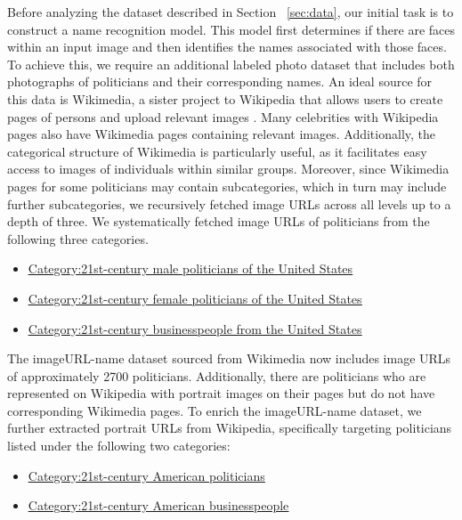 \documentclass[sigconf]{acmart}
\begin{document}
Before analyzing the dataset described in Section ~\ref{sec:data}, our initial task is to construct a name recognition model. This model first determines if there are faces within an input image and then identifies the names associated with those faces. To achieve this, we require an additional labeled photo dataset that includes both photographs of politicians and their corresponding names. An ideal source for this data is Wikimedia, a sister project to Wikipedia that allows users to create pages of persons and upload relevant images \cite{wikimedia}. Many celebrities with Wikipedia pages also have Wikimedia pages containing relevant images. Additionally, the categorical structure of Wikimedia is particularly useful, as it facilitates easy access to images of individuals within similar groups. Moreover, since Wikimedia pages for some politicians may contain subcategories, which in turn may include further subcategories, we recursively fetched image URLs across all levels up to a depth of three. We systematically fetched image URLs of politicians from the following three categories.

\begin{itemize}
  \item \href{https://commons.wikimedia.org/wiki/Category:21st-century_male_politicians_of_the_United_States}{\underline{Category:21st-century male politicians of the United States}}
  \item \href{https://commons.wikimedia.org/wiki/Category:21st-century_female_politicians_of_the_United_States}{\underline{Category:21st-century female politicians of the United States}}
  \item \href{https://commons.wikimedia.org/w/index.php?title=Category:21st-century_businesspeople_from_the_United_States&oldid=527515279}{\underline{Category:21st-century businesspeople from the United States}}
\end{itemize}

The imageURL-name dataset sourced from Wikimedia now includes image URLs of approximately 2700 politicians. Additionally, there are politicians who are represented on Wikipedia with portrait images on their pages but do not have corresponding Wikimedia pages. To enrich the imageURL-name dataset, we further extracted portrait URLs from Wikipedia, specifically targeting politicians listed under the following two categories:

\begin{itemize}
  \item \href{https://en.wikipedia.org/w/index.php?title=Category:21st-century_American_politicians&oldid=1015022478}{\underline{Category:21st-century American politicians}}
  \item \href{https://en.wikipedia.org/w/index.php?title=Category:21st-century_American_businesspeople&oldid=1110690935}{\underline{Category:21st-century American businesspeople}}

\end{itemize}
\end{document}
